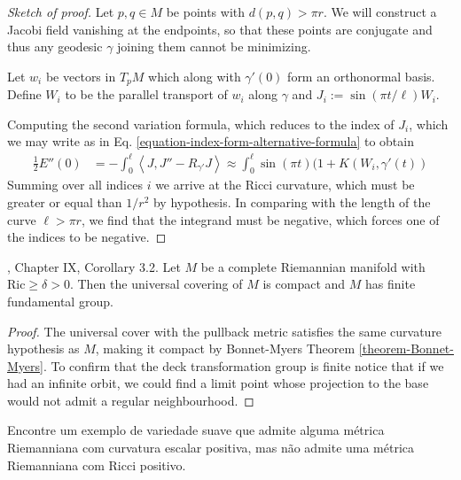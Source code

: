 \begin{proof}[Sketch of proof]
Let $p,q \in M$ be points with $d(p,q)>\pi r$. We will construct a Jacobi
field vanishing at the endpoints, so that these points are conjugate and thus
any geodesic $\gamma$ joining them cannot be minimizing.

Let $w_i$ be vectors in $T_pM$ which along with $\gamma'(0)$ form an orthonormal
basis. Define $W_i$ to be the parallel transport of $w_i$ along $\gamma$ and
$J_i:=\sin(\pi t/\ell)W_i$.

Computing the second variation formula, which reduces to the index of $J_i$,
which we may write as in Eq. \ref{equation-index-form-alternative-formula} to
obtain
\begin{align*}
\frac{1}{2}E''(0)&=-\int_0^\ell\left<J,J''-R_{\gamma'}J\right>
\approx\int_0^\ell \sin(\pi t)(1+K(W_i,\gamma'(t))
\end{align*}
Summing over all indices $i$ we arrive at the Ricci curvature, which must be
greater or equal than $1/r^2$ by hypothesis. In comparing with the length of the
curve $\ell>\pi r$, we find that the integrand must be
negative, which forces one of the indices to be negative.
\end{proof}

\begin{lemma}
\label{lemma-Bonnet-Myers-implies-compact-universal-covering-and-finite
fundamental-group}
\cite{doc}, Chapter IX, Corollary 3.2. Let $M$ be a complete Riemannian manifold
with $\text{Ric}\geq \delta>0$. Then the universal covering of $M$ is compact
and $M$ has finite fundamental group.
\end{lemma}

\begin{proof}

The universal cover with the pullback metric satisfies the same curvature
hypothesis as $M$, making it compact by Bonnet-Myers Theorem
\ref{theorem-Bonnet-Myers}. To confirm that the deck transformation group is
finite notice that if we had an infinite orbit, we could find a limit point
whose projection to the base would not admit a regular neighbourhood. 
\end{proof}


\begin{exercise}[Exercício 3]
\label{exercise-positive-scalar-but-no-positive-Ricci}
Encontre um exemplo de variedade suave que admite alguma métrica Riemanniana com
curvatura escalar positiva, mas não admite uma métrica Riemanniana com Ricci
positivo.
\end{exercise}

